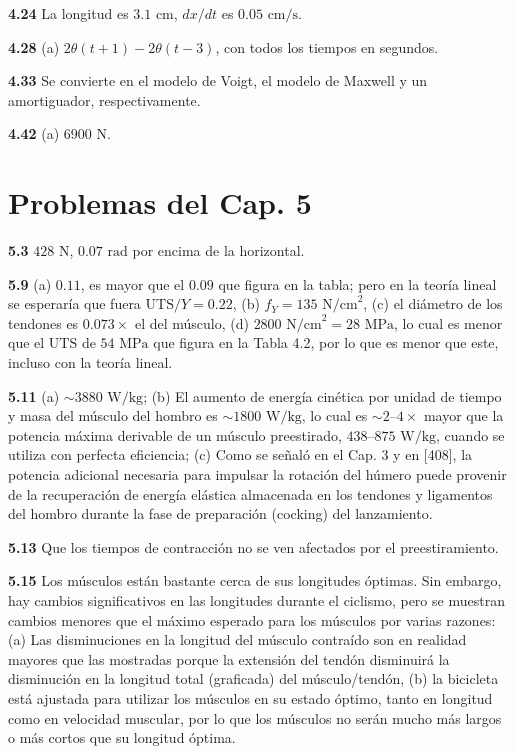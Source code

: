 \documentclass[12pt,a4paper]{book}
\begin{document}
\noindent \textbf{4.24} La longitud es $3.1\text{ cm}$, $dx/dt$ es $0.05\text{ cm/s}$.

\noindent \textbf{4.28} (a) $2\theta(t + 1) - 2\theta(t - 3)$, con todos los tiempos en segundos.

\noindent \textbf{4.33} Se convierte en el modelo de Voigt, el modelo de Maxwell y un amortiguador, respectivamente.

\noindent \textbf{4.42} (a) $6900\text{ N}$.

\section*{Problemas del Cap. 5}

\noindent \textbf{5.3} $428\text{ N}$, $0.07\text{ rad}$ por encima de la horizontal.

\noindent \textbf{5.9} (a) $0.11$, es mayor que el $0.09$ que figura en la tabla; pero en la teoría lineal se esperaría que fuera $\text{UTS}/Y = 0.22$, (b) $f_Y = 135\text{ N/cm}^2$, (c) el diámetro de los tendones es $0.073\times$ el del músculo, (d) $2800\text{ N/cm}^2 = 28\text{ MPa}$, lo cual es menor que el $\text{UTS}$ de $54\text{ MPa}$ que figura en la Tabla 4.2, por lo que es menor que este, incluso con la teoría lineal.

\noindent \textbf{5.11} (a) $\sim 3880\text{ W/kg}$; (b) El aumento de energía cinética por unidad de tiempo y masa del músculo del hombro es $\sim 1800\text{ W/kg}$, lo cual es $\sim 2\text{--}4\times$ mayor que la potencia máxima derivable de un músculo preestirado, $438\text{--}875\text{ W/kg}$, cuando se utiliza con perfecta eficiencia; (c) Como se señaló en el Cap. 3 y en [408], la potencia adicional necesaria para impulsar la rotación del húmero puede provenir de la recuperación de energía elástica almacenada en los tendones y ligamentos del hombro durante la fase de preparación (cocking) del lanzamiento.

\noindent \textbf{5.13} Que los tiempos de contracción no se ven afectados por el preestiramiento.

\noindent \textbf{5.15} Los músculos están bastante cerca de sus longitudes óptimas. Sin embargo, hay cambios significativos en las longitudes durante el ciclismo, pero se muestran cambios menores que el máximo esperado para los músculos por varias razones: (a) Las disminuciones en la longitud del músculo contraído son en realidad mayores que las mostradas porque la extensión del tendón disminuirá la disminución en la longitud total (graficada) del músculo/tendón, (b) la bicicleta está ajustada para utilizar los músculos en su estado óptimo, tanto en longitud como en velocidad muscular, por lo que los músculos no serán mucho más largos o más cortos que su longitud óptima.
\end{document}

